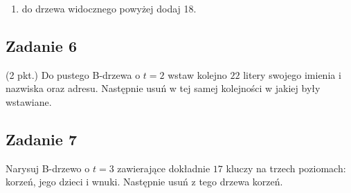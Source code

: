 \documentclass{article}
\begin{document}
\begin{center}
\begin{enumerate}[label=-]
        \item do drzewa widocznego powyżej dodaj 18.
    \end{enumerate}
\end{center}

\subsection*{Zadanie 6}
(2 pkt.) Do pustego B-drzewa o $t=2$ wstaw kolejno $22$ litery swojego imienia i nazwiska oraz adresu. Następnie usuń w
tej samej kolejności w jakiej były wstawiane.

\subsection*{Zadanie 7}
Narysuj B-drzewo o $t=3$ zawierające dokładnie $17$ kluczy na trzech poziomach: korzeń, jego dzieci i wnuki. Następnie
usuń z tego drzewa korzeń.
\end{document}
